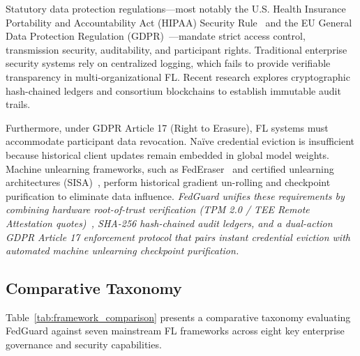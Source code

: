 Statutory data protection regulations—most notably the U.S. Health Insurance Portability and Accountability Act (HIPAA) Security Rule~\cite{hipaa2003security} and the EU General Data Protection Regulation (GDPR)~\cite{gdpr2016regulation}—mandate strict access control, transmission security, auditability, and participant rights. Traditional enterprise security systems rely on centralized logging, which fails to provide verifiable transparency in multi-organizational FL. Recent research explores cryptographic hash-chained ledgers and consortium blockchains to establish immutable audit trails.

Furthermore, under GDPR Article 17 (Right to Erasure), FL systems must accommodate participant data revocation. Na\"ive credential eviction is insufficient because historical client updates remain embedded in global model weights. Machine unlearning frameworks, such as FedEraser~\cite{liu2021federaser} and certified unlearning architectures (SISA)~\cite{bourtoule2021machine, wang2023federated}, perform historical gradient un-rolling and checkpoint purification to eliminate data influence. \textit{FedGuard unifies these requirements by combining hardware root-of-trust verification (TPM 2.0 / TEE Remote Attestation quotes)~\cite{mo2021ppfl}, SHA-256 hash-chained audit ledgers, and a dual-action GDPR Article 17 enforcement protocol that pairs instant credential eviction with automated machine unlearning checkpoint purification.}

\subsection{Comparative Taxonomy}

Table~\ref{tab:framework_comparison} presents a comparative taxonomy evaluating FedGuard against seven mainstream FL frameworks across eight key enterprise governance and security capabilities.

